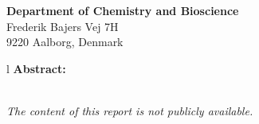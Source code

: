 \begin{minipage}[t]{0.5\textwidth}
\vspace{-3cm}
\textbf{Department of Chemistry \newline and Bioscience} \\
Frederik Bajers Vej 7H \\
9220 Aalborg, Denmark \\



\vspace{1cm}

\begin{table}[H]
    \begin{tabular}{l}
        \textbf{Abstract:}                   \\ \hline
         \\ \hline
    \end{tabular}
\end{table}
\end{minipage}

\vfill

\begingroup
    \scriptsize{\textit{The content of this report is not publicly available.}}
\endgroup
\thispagestyle{empty}

